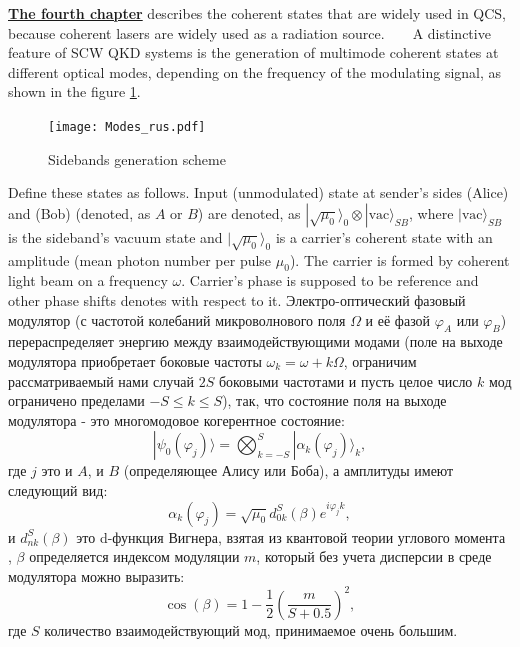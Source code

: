 
 \underline{\textbf{The fourth chapter}} describes the coherent states that are widely used in QCS, because coherent lasers are widely used as a radiation source.
 
  A distinctive feature of SCW QKD systems is the generation of multimode coherent states at different optical modes, depending on the frequency of the modulating signal, as shown in the figure \ref{fig:multimodes}. 

 \begin{figure}[ht]
  \centering
  \texttt{[image: Modes\_rus.pdf]}
  \caption{Sidebands generation scheme}
  \label{fig:multimodes}
\end{figure}


Define these states as follows. Input (unmodulated) state at sender's sides (Alice) and (Bob) (denoted, as $A$ or $B$) are denoted, as $|\sqrt{\mu_0}\rangle_0\otimes|\mathrm{vac}\rangle_{SB}$, where $|\mathrm{vac}\rangle_{SB}$ is the sideband's vacuum state and $|\sqrt{\mu_0}\rangle_0$ is a carrier's coherent state with an amplitude (mean photon number per pulse $\mu_0$). The carrier is formed by coherent light beam on a frequency $\omega$. Carrier's phase is supposed to be reference and other phase shifts denotes with respect to it. Электро-оптический фазовый модулятор (с частотой колебаний микроволнового поля $\Omega$ и её фазой $\varphi_A$ или $\varphi_B$) перераспределяет энергию между взаимодействующими модами (поле на выходе модулятора приобретает боковые частоты $\omega_k=\omega+k\Omega$, ограничим рассматриваемый нами случай $2S$ боковыми частотами и пусть целое число $k$ мод ограничено пределами $-S\le k\le S$), так, что состояние поля на выходе модулятора - это многомодовое когерентное состояние: 
%
\begin{equation}\label{phi}
|\psi_0(\varphi_j)\rangle = \bigotimes_{k=-S}^S|{\alpha_k(\varphi_j)}\rangle_k,
\end{equation}
%
где $j$ это и $A$, и $B$ (определяющее Алису или Боба), а амплитуды имеют следующий вид: 
%
\begin{equation}\label{alpha}
\alpha_k(\varphi_j)=\sqrt{\mu_0}d^S_{0k}(\beta)e^{i\varphi_jk},
\end{equation}
%
и $d^S_{nk}(\beta)$ это d-функция Вигнера, взятая из квантовой теории углового момента %
, $\beta$ определяется индексом модуляции $m$, который без учета дисперсии в среде модулятора можно выразить: 
%
\begin{equation}\label{betam}
\cos{({\beta})}=1-\frac{1}{2}{\left(\frac{m}{S+0.5}\right)^2},
\end{equation}
где $S$ количество взаимодействующий мод, принимаемое очень большим.

